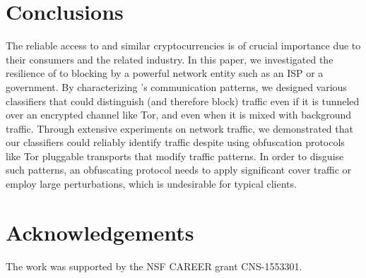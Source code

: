 \section{Conclusions}

The reliable access to \bc and similar cryptocurrencies is of crucial importance due to
their consumers and the related industry. 
In this paper, we investigated the resilience of \bc to blocking by a powerful network entity such as an ISP or a government.
By characterizing \bc's communication patterns, we designed 
various classifiers that could distinguish (and therefore block) \bc traffic 
even if it is tunneled over an encrypted channel like Tor, 
and even when it is mixed with background traffic. Through extensive experiments on network traffic, we demonstrated that our classifiers could reliably identify \bc traffic despite using obfuscation protocols like Tor pluggable transports that modify traffic patterns. In order to disguise such patterns, an obfuscating protocol needs to apply significant cover traffic or employ large perturbations, which is undesirable for typical clients. 

 
\section*{Acknowledgements}
The work was supported by the NSF CAREER grant CNS-1553301.

